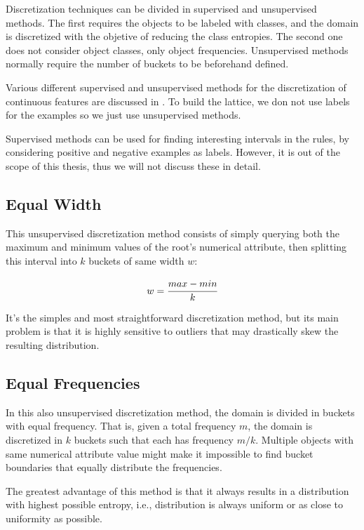 Discretization techniques can be divided in supervised and unsupervised methods. The first requires the objects to
be labeled with classes, and the domain is discretized with the objetive of reducing the class entropies. The second
one does not consider object classes, only object frequencies. Unsupervised methods normally require the number of
buckets to be beforehand defined.

Various different supervised and unsupervised methods for the discretization of continuous features are discussed in
\citet{Dougherty95supervisedand}. To build the lattice, we don not use labels for the examples so we just use
unsupervised methods.

Supervised methods can be used for finding interesting intervals in the rules, by considering positive and negative
examples as labels. However, it is out of the scope of this thesis, thus we will not discuss these in detail.

\subsection{Equal Width}
This unsupervised discretization method consists of simply querying both the maximum and minimum values of the root's
numerical attribute, then splitting this interval into $k$ buckets of same width $w$:

\begin{equation}
 w=\cfrac{max-min}{k}
\end{equation}

It's the simples and most straightforward discretization method, but its main problem is that it is highly
sensitive to outliers that may drastically skew the resulting distribution.

\subsection{Equal Frequencies}
In this also unsupervised discretization method, the domain is divided in buckets with equal frequency. That is, given
a
total frequency $m$, the domain is discretized in $k$ buckets such that each has frequency $m/k$. Multiple
objects with same numerical attribute value might make it impossible to find bucket boundaries that equally
distribute the frequencies.

The greatest advantage of this method is that it always results in a distribution with highest possible entropy, i.e.,
distribution is always uniform or as close to uniformity as possible.

